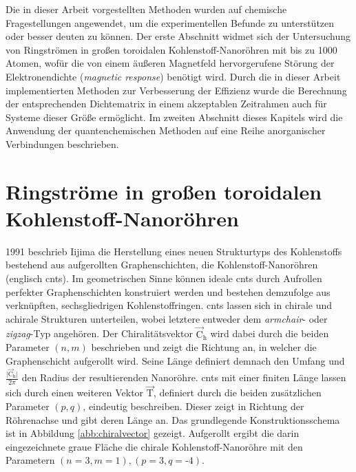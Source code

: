 Die in dieser Arbeit vorgestellten Methoden wurden auf chemische Fragestellungen angewendet, um die experimentellen Befunde zu unterstützen oder besser deuten zu können.
Der erste Abschnitt widmet sich der Untersuchung von Ringströmen in großen toroidalen Kohlenstoff-Nanoröhren mit bis zu 1000 Atomen, wofür die von einem äußeren Magnetfeld hervorgerufene Störung der Elektronendichte (\textit{magnetic response}) benötigt wird. Durch die in dieser Arbeit implementierten Methoden zur Verbesserung der Effizienz wurde die Berechnung der entsprechenden Dichtematrix in einem akzeptablen Zeitrahmen auch für Systeme dieser Größe ermöglicht. Im zweiten Abschnitt dieses Kapitels wird die Anwendung der quantenchemischen Methoden auf eine Reihe anorganischer Verbindungen beschrieben.  

\section{Ringströme in großen toroidalen Kohlenstoff-Nanoröhren}
1991 beschrieb Iijima\supercite{iijima1991helical} die Herstellung eines neuen Strukturtyps des Kohlenstoffs bestehend aus aufgerollten Graphenschichten, die Kohlenstoff-Nanoröhren (englisch \acp{cnt}). Im geometrischen Sinne können ideale \acp{cnt} durch Aufrollen perfekter Graphenschichten konstruiert werden und bestehen demzufolge aus verknüpften, sechsgliedrigen Kohlenstoffringen. \acp{cnt} lassen sich in chirale und achirale Strukturen unterteilen, wobei letztere entweder dem \textit{armchair}- oder \textit{zigzag}-Typ angehören. Der Chiralitätsvektor $\vec{\text{C}}_\text{h}$ wird dabei durch die beiden Parameter $(n,m)$ beschrieben und zeigt die Richtung an, in welcher die Graphenschicht aufgerollt wird. Seine Länge definiert demnach den Umfang und $\frac{\vert\vec{\text{C}}_\text{h}\vert}{2\pi}$ den Radius der resultierenden Nanoröhre. \acp{cnt} mit einer finiten Länge lassen sich durch einen weiteren Vektor $\vec{\text{T}}$, definiert durch die beiden zusätzlichen Parameter $(p,q)$, eindeutig beschreiben. Dieser zeigt in Richtung der Röhrenachse und gibt deren Länge an. Das grundlegende Konstruktionsschema ist in Abbildung \ref{abb:chiralvector} gezeigt. Aufgerollt ergibt die darin eingezeichnete graue Fläche die chirale Kohlenstoff-Nanoröhre mit den Parametern $(n=3,m=1),(p=3,q=\textrm{-}4)$.
